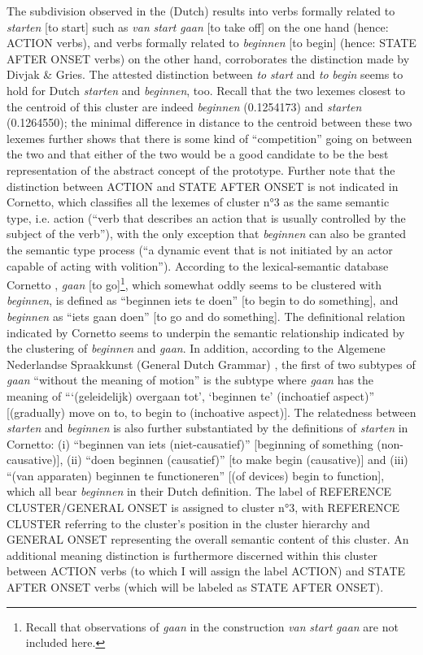 The subdivision observed in the (Dutch) results into verbs formally related to \textit{starten} [to start] such as \textit{van} \textit{start} \textit{gaan} [to take off] on the one hand (hence: ACTION verbs), and verbs formally related to \textit{beginnen} [to begin] (hence: STATE AFTER ONSET verbs) on the other hand, corroborates the distinction made by Divjak \& Gries. The attested distinction between \textit{to} \textit{start} and \textit{to} \textit{begin} seems to hold for Dutch \textit{starten} and \textit{beginnen}, too. Recall that the two lexemes closest to the centroid of this cluster are indeed \textit{beginnen} (0.1254173) and \textit{starten} (0.1264550); the minimal difference in distance to the centroid between these two lexemes further shows that there is some kind of ``competition'' going on between the two and that either of the two would be a good candidate to be the best representation of the abstract concept of the prototype. Further note that the distinction between ACTION and STATE AFTER ONSET is not indicated in Cornetto, which classifies all the lexemes of cluster n°3 as the same semantic type, i.e. action (“verb that describes an action that is usually controlled by the subject of the verb”), with the only exception that \textit{beginnen} can also be granted the semantic type process (“a dynamic event that is not initiated by an actor capable of acting with volition”). According to the lexical-semantic database Cornetto \citep{vossen_cornetto_2008}, \textit{gaan} [to go]\footnote{Recall that observations of \textit{gaan} in the construction \textit{van} \textit{start} \textit{gaan} are not included here.}, which somewhat oddly seems to be clustered with \textit{beginnen}, is defined as “beginnen iets te doen” [to begin to do something], and \textit{beginnen} as “iets gaan doen” [to go and do something]. The definitional relation indicated by Cornetto seems to underpin the semantic relationship indicated by the clustering of \textit{beginnen} and \textit{gaan}. In addition, according to the Algemene Nederlandse Spraakkunst (General Dutch Grammar) \citep{haeseryn_algemene_2012}, the first of two subtypes of \textit{gaan} “without the meaning of motion” is the subtype where \textit{gaan} has the meaning of “‘(geleidelijk) overgaan tot’, ‘beginnen te’ (inchoatief aspect)” [(gradually) move on to, to begin to (inchoative aspect)]. The relatedness between \textit{starten} and \textit{beginnen} is also further substantiated by the definitions of \textit{starten} in Cornetto: (i) “beginnen van iets (niet-causatief)” [beginning of something (non-causative)], (ii) “doen beginnen (causatief)” [to make begin (causative)] and (iii) “(van apparaten) beginnen te functioneren” [(of devices) begin to function], which all bear \textit{beginnen} in their Dutch definition. The label of REFERENCE CLUSTER\slash GENERAL ONSET is assigned to cluster n°3, with REFERENCE CLUSTER referring to the cluster’s position in the cluster hierarchy and GENERAL ONSET representing the overall semantic content of this cluster. An additional meaning distinction is furthermore discerned within this cluster between ACTION verbs (to which I will assign the label ACTION) and STATE AFTER ONSET verbs (which will be labeled as STATE AFTER ONSET).

